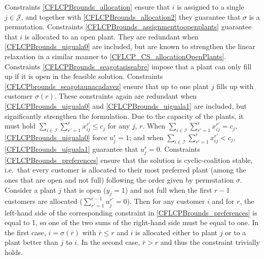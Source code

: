 \documentclass[preprint,11pt,authoryear]{elsarticle}
\def\J{\mathcal{J}}
\def\I{\mathcal{I}}
\begin{document}
Constraints \eqref{CFLCPBrounds_allocation} ensure that $i$ is assigned to a single $j\in \J$, and together with  \eqref{CFLCPBrounds_allocation2} they guarantee that $\sigma$ is a permutation. Constraints \eqref{CFLCPBrounds_assignmenttoopenplants} guarantee that $i$ is allocated to an open plant. They are redundant when \eqref{CFLCPBrounds_uiguala0} are included, but are known to strengthen the linear relaxation in a similar manner to \eqref{CFLCP_CS_allocationOpenPlants}. Constraints \eqref{CFLCPBrounds_seagotasiseabre} impose that a plant can only fill up if it is open in the feasible solution. Constraints \eqref{CFLCPbrounds_seagotaunacadavez} ensure that up to one plant $j$ fills up with customer $\sigma(r)$. These constraints again are redundant when \eqref{CFLCPBrounds_uiguala0} and \eqref{CFLCPBrounds_uiguala1} are included, but significantly strengthen the formulation. Due to the capacity of the plants, it must hold $\sum_{i\in \I} \sum_{r'=1}^r x^{r'}_{ij} \le c_j$ for any $j$, $r$. When $\sum_{i\in \I} \sum_{r'=1}^r x^{r'}_{ij} = c_j$, \eqref{CFLCPBrounds_uiguala0} force $u^r_j=1$; and when $\sum_{i\in \I} \sum_{r'=1}^r x^{r'}_{ij} < c_j$, \eqref{CFLCPBrounds_uiguala1} guarantee that $u^r_j=0$. Constraints \eqref{CFLCPBrounds_preferences} ensure that the solution is cyclic-coalition stable, i.e.\ that every customer is allocated to their most preferred plant (among the ones that are open and not full) following the order given by permutation $\sigma$. 
Consider a plant $j$ that is open ($y_j=1$) and not full when the first $r-1$ customers are allocated ($\sum_{r'=1}^{r-1} u_j^{r'}=0$). Then for any customer $i$ and for $r$, the left-hand side of the corresponding constraint in \eqref{CFLCPBrounds_preferences} is equal to 1, so one of the two sums of the right-hand side must be equal to one. In the first case,  $i=\sigma(\bar{r})$ with $\bar{r}\le r$ and $i$ is allocated either to plant $j$ or to a plant better than $j$ to $i$. In the second case, $\bar{r} > r$ and thus the constraint trivially holds.
\end{document}
